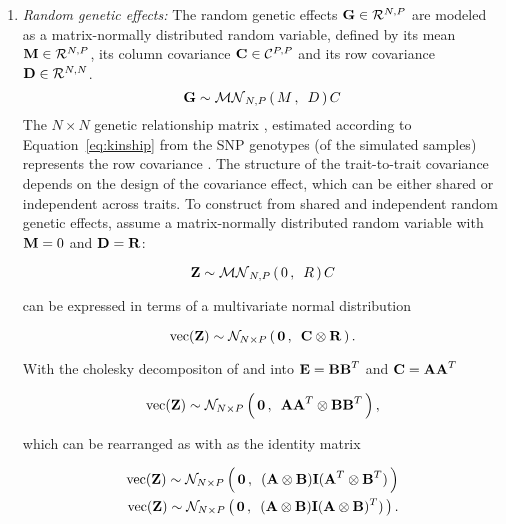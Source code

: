 \begin{enumerate}
\item \textit{Random genetic effects:} The random genetic effects \(\boldsymbol{\mathbf{G}} \in \mathcal{R}^{N,P}\) are modeled as a matrix-normally distributed random variable, defined by its mean \(\boldsymbol{\mathbf{M}} \in \mathcal{R}^{N,P}\), its column covariance \(\boldsymbol{\mathbf{C}} \in \mathcal{C}^{P,P}\) and its row covariance \(\boldsymbol{\mathbf{D}} \in \mathcal{R}^{N,N}\).  
\begin{equation}
\boldsymbol{\mathbf{G}} \sim \mathcal{MN}_{N,P}\left(\, {M} \,,\,~{D} \,\right) C
\end{equation}
The \(N \times N\) genetic relationship matrix , estimated according to Equation~\ref{eq:kinship} from the SNP genotypes (of the simulated samples) represents the row covariance .  The structure of the trait-to-trait covariance  depends on the design of the covariance effect, which can be either shared or independent across traits. To construct  from shared and independent random genetic effects, assume a matrix-normally distributed random variable  with \(\boldsymbol{\mathbf{M}}=0\)  and \(\boldsymbol{\mathbf{D}} = \boldsymbol{\mathbf{R}}\):

\begin{equation}
\boldsymbol{\mathbf{Z}} \sim  \mathcal{MN}_{N,P}\left(\, {0} \,,\,~{R} \,\right) C
\end{equation}

 can be expressed in terms of a multivariate normal distribution 

\begin{equation}
\text{vec}(\boldsymbol{\mathbf{Z}}) \sim \mathcal{N}_{N\times P}\left(\, {\boldsymbol{\mathbf{0}}} \,,\,~{\boldsymbol{\mathbf{C}} \otimes \boldsymbol{\mathbf{R}}} \,\right).
\end{equation}

With the cholesky decompositon of  and  into  \(\boldsymbol{\mathbf{E}}=\boldsymbol{\mathbf{BB}}^T\) and \(\boldsymbol{\mathbf{C}}=\boldsymbol{\mathbf{AA}}^T\) 

\begin{equation}
\text{vec}(\boldsymbol{\mathbf{Z}}) \sim \mathcal{N}_{N\times P}\left(\, {\boldsymbol{\mathbf{0}}} \,,\,~{\boldsymbol{\mathbf{AA}}^T  \otimes \boldsymbol{\mathbf{BB}}^T} \,\right),  
\end{equation}

which can be rearranged  as with  as the identity matrix

\begin{equation}
\begin{aligned}
\text{vec}(\boldsymbol{\mathbf{Z}}) \sim \mathcal{N}_{N\times P}\left(\, {\boldsymbol{\mathbf{0}}} \,,\,~{(\boldsymbol{\mathbf{A}} \otimes \boldsymbol{\mathbf{B}}) \boldsymbol{\mathbf{I}} (\boldsymbol{\mathbf{A}}^T \otimes \boldsymbol{\mathbf{B}}^T)} \,\right) \\
\text{vec}(\boldsymbol{\mathbf{Z}})  \sim \mathcal{N}_{N\times P}\left(\, {\boldsymbol{\mathbf{0}}} \,,\,~{(\boldsymbol{\mathbf{A }}\otimes \boldsymbol{\mathbf{B}}) \boldsymbol{\mathbf{I}} (\boldsymbol{\mathbf{A}} \otimes\boldsymbol{\mathbf{B}})^T)} \,\right).
\end{aligned}
\end{equation}


\end{enumerate}
